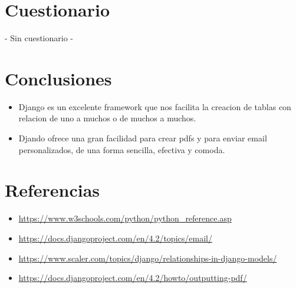\documentclass{article}
\begin{document}
\section{Cuestionario}
	- Sin cuestionario -	
 \newpage
 \section{Conclusiones}
	\begin{itemize}
		\item Django es un excelente framework que nos facilita la creacion de tablas con relacion de uno a muchos o de muchos a muchos.
            \item Djando ofrece una gran facilidad para crear pdfs y para enviar email personalizados, de una forma sencilla, efectiva y comoda.
	\end{itemize}	
\clearpage

\section{Referencias}
\begin{itemize}	
    \item \url{https://www.w3schools.com/python/python_reference.asp}
    \item \url{https://docs.djangoproject.com/en/4.2/topics/email/}
    \item \url{https://www.scaler.com/topics/django/relationships-in-django-models/}
    \item \url{https://docs.djangoproject.com/en/4.2/howto/outputting-pdf/}
\end{itemize}	
	
%
%
%
			
\end{document}
